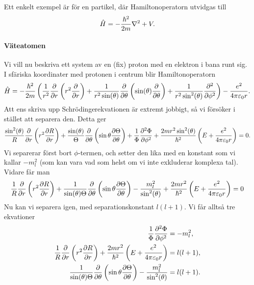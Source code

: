 Ett enkelt exempel är för en partikel, där Hamiltonoperatorn utvidgas till
\begin{align*}
	\hat{H} = -\frac{\hbar^{2}}{2m}\laplacian + V.
\end{align*}

\paragraph{Väteatomen}
Vi vill nu beskriva ett system av en (fix) proton med en elektron i bana runt sig. I sfäriska koordinater med protonen i centrum blir Hamiltonoperatorn
\begin{align*}
	\hat{H} = -\frac{\hbar^{2}}{2m}\left(\frac{1}{r^{2}}\pdv{r}\left(r^{2}\pdv{r}\right) + \frac{1}{r^{2}\sin(\theta)}\pdv{\theta}\left(\sin(\theta)\pdv{\theta}\right) + \frac{1}{r^{2}\sin^{2}(\theta)}\pdv[2]{\phi}\right) - \frac{e^{2}}{4\pi\varepsilon_{0}r}.
\end{align*}
Att ens skriva upp Schrödingerekvationen är extremt jobbigt, så vi försöker i stället att separera den. Detta ger
\begin{align*}
	\frac{\sin^{2}(\theta)}{R}\pdv{r}\left(r^{2}\pdv{R}{r}\right) + \frac{\sin(\theta)}{\Theta}\pdv{\theta}\left(\sin{\theta}\pdv{\Theta}{\theta}\right) + \frac{1}{\Phi}\pdv[2]{\Phi}{\phi} + \frac{2mr^{2}\sin^{2}(\theta)}{\hbar^{2}}\left(E + \frac{e^{2}}{4\pi\varepsilon_{0}r}\right) = 0.
\end{align*}
Vi separerar först bort $\phi$-termen, och setter den lika med en konstant som vi kallar $-m_{l}^{2}$ (som kan vara vad som helst om vi inte exkluderar komplexa tal). Vidare får man
\begin{align*}
	\frac{1}{R}\pdv{r}\left(r^{2}\pdv{R}{r}\right) + \frac{1}{\sin(\theta)\Theta}\pdv{\theta}\left(\sin{\theta}\pdv{\Theta}{\theta}\right) - \frac{m_{l}^{2}}{\sin^{2}(\theta)} + \frac{2mr^{2}}{\hbar^{2}}\left(E + \frac{e^{2}}{4\pi\varepsilon_{0}r}\right) = 0
\end{align*}
Nu kan vi separera igen, med separationskonstant $l(l + 1)$. Vi får alltså tre ekvationer
\begin{align*}
	\frac{1}{\Phi}\pdv[2]{\Phi}{\phi}     &= -m_{l}^{2}, \\
	\frac{1}{R}\pdv{r}\left(r^{2}\pdv{R}{r}\right) + \frac{2mr^{2}}{\hbar^{2}}\left(E + \frac{e^{2}}{4\pi\varepsilon_{0}r}\right) &= l(l + 1), \\
	\frac{1}{\sin(\theta)\Theta}\pdv{\theta}\left(\sin{\theta}\pdv{\Theta}{\theta}\right) - \frac{m_{l}^{2}}{\sin^{2}(\theta)}      &= l(l + 1).
\end{align*}
